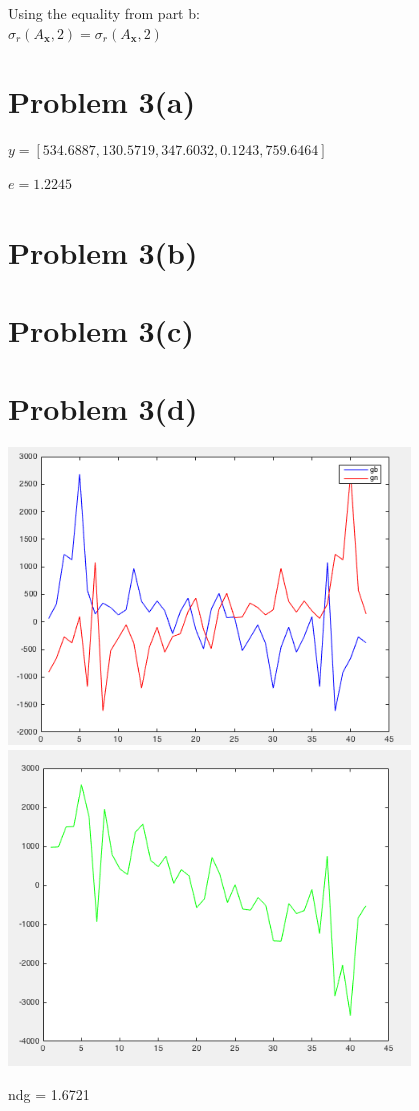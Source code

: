 \documentclass{article}
\begin{document}
Using the equality from part b:\\

$\sigma_r(A_\textbf{x}, 2) = \sigma_r(A_\textbf{x}, 2)$\\

\section*{Problem 3(a)}


$y = [534.6887, 130.5719, 347.6032, 0.1243, 759.6464]$

$e = 1.2245$

\section*{Problem 3(b)}


\section*{Problem 3(c)}


\section*{Problem 3(d)}



\includegraphics[width=0.8\textwidth]{graph1.png}
\includegraphics[width=0.8\textwidth]{graph2.png}

ndg = 1.6721
\end{document}
